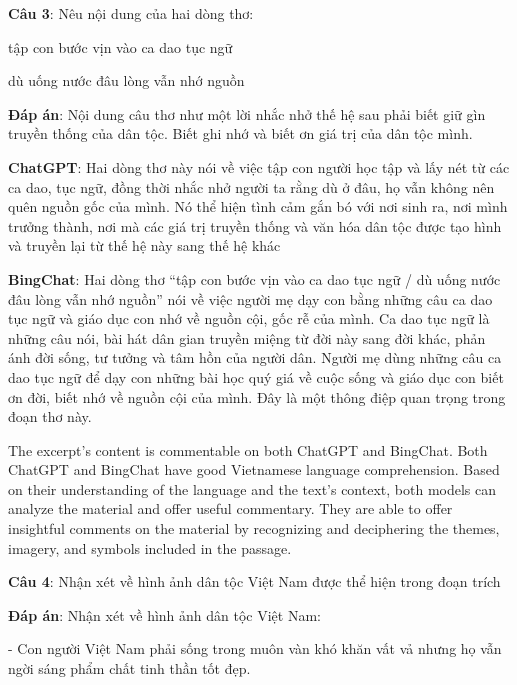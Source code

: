 \documentclass{article}
\begin{document}
{	
	
	\begin{mdframed}[linewidth=1pt,linecolor=red] 	
\textbf{Câu 3}: Nêu nội dung của hai dòng thơ:


		
		tập con bước vịn vào ca dao tục ngữ 
		
		dù uống nước đâu lòng vẫn nhớ nguồn 
		
		
		\textbf{Đáp án}: Nội dung câu thơ như một lời nhắc nhở thế hệ sau phải biết giữ gìn truyền thống của dân tộc. Biết ghi nhớ và biết ơn giá trị của dân tộc mình.
		
		\textbf{ChatGPT}: Hai dòng thơ này nói về việc tập con người học tập và lấy nét từ các ca dao, tục ngữ, đồng thời nhắc nhở người ta rằng dù ở đâu, họ vẫn không nên quên nguồn gốc của mình. Nó thể hiện tình cảm gắn bó với nơi sinh ra, nơi mình trưởng thành, nơi mà các giá trị truyền thống và văn hóa dân tộc được tạo hình và truyền lại từ thế hệ này sang thế hệ khác
		
		\textbf{BingChat}: Hai dòng thơ “tập con bước vịn vào ca dao tục ngữ / dù uống nước đâu lòng vẫn nhớ nguồn” nói về việc người mẹ dạy con bằng những câu ca dao tục ngữ và giáo dục con nhớ về nguồn cội, gốc rễ của mình. Ca dao tục ngữ là những câu nói, bài hát dân gian truyền miệng từ đời này sang đời khác, phản ánh đời sống, tư tưởng và tâm hồn của người dân. Người mẹ dùng những câu ca dao tục ngữ để dạy con những bài học quý giá về cuộc sống và giáo dục con biết ơn đời, biết nhớ về nguồn cội của mình. Đây là một thông điệp quan trọng trong đoạn thơ này.
		
	\end{mdframed}
	
	The excerpt's content is commentable on both ChatGPT and BingChat. Both ChatGPT and BingChat have good Vietnamese language comprehension. Based on their understanding of the language and the text's context, both models can analyze the material and offer useful commentary. They are able to offer insightful comments on the material by recognizing and deciphering the themes, imagery, and symbols included in the passage.
	
	
	\begin{mdframed}[linewidth=1pt,linecolor=red] 		
\textbf{Câu 4}: Nhận xét về hình ảnh dân tộc Việt Nam được thể hiện trong đoạn trích 
		
\textbf{Đáp án}: Nhận xét về hình ảnh dân tộc Việt Nam:
		
		- Con người Việt Nam phải sống trong muôn vàn khó khăn vất vả nhưng họ vẫn ngời sáng phẩm chất tinh thần tốt đẹp.
		

\end{mdframed}}
\end{document}
